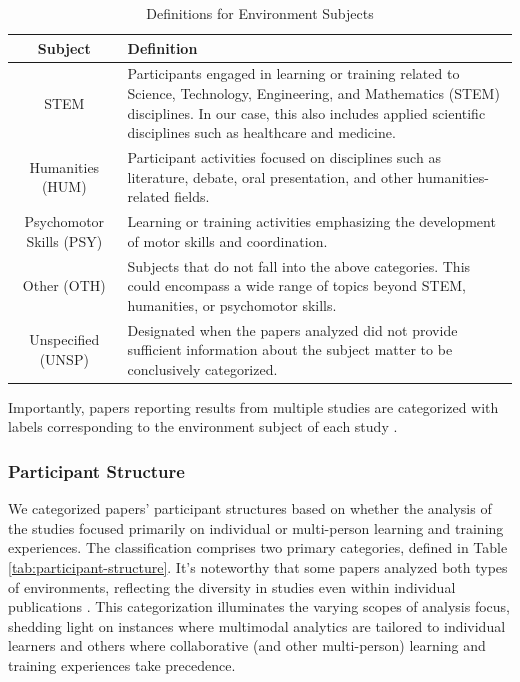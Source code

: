\documentclass[manuscript,screen,review]{acmart}
\begin{document}
\begin{table}[ht]
  \centering
  \caption{Definitions for Environment Subjects}
  \label{tab:environment-subjects}
  \begin{tabular}{|c|p{}|}
    \hline
    \textbf{Subject} & \textbf{Definition} \\
    \hline
    STEM & Participants engaged in learning or training related to Science, Technology, Engineering, and Mathematics (STEM) disciplines. In our case, this also includes applied scientific disciplines such as healthcare and medicine.\\
    \hline
    Humanities (HUM) & Participant activities focused on disciplines such as literature, debate, oral presentation, and other humanities-related fields. \\
    \hline
    Psychomotor Skills (PSY) & Learning or training activities emphasizing the development of motor skills and coordination. \\
    \hline
    Other (OTH) & Subjects that do not fall into the above categories. This could encompass a wide range of topics beyond STEM, humanities, or psychomotor skills. \\
    \hline
    Unspecified (UNSP) & Designated when the papers analyzed did not provide sufficient information about the subject matter to be conclusively categorized. \\
    \hline
  \end{tabular}
\end{table}


Importantly, papers reporting results from multiple studies are categorized with labels corresponding to the environment subject of each study \cite{3796643912,2055153191}. 


\subsubsection{Participant Structure} \label{subsec:participant_structure}


We categorized papers' participant structures based on whether the analysis of the studies focused primarily on individual or multi-person learning and training experiences. The classification comprises two primary categories, defined in Table \ref{tab:participant-structure}. It's noteworthy that some papers analyzed both types of environments, reflecting the diversity in studies even within individual publications \cite{1326191931, 3637456466}. This categorization illuminates the varying scopes of analysis focus, shedding light on instances where multimodal analytics are tailored to individual learners and others where collaborative (and other multi-person) learning and training experiences take precedence.
\end{document}

